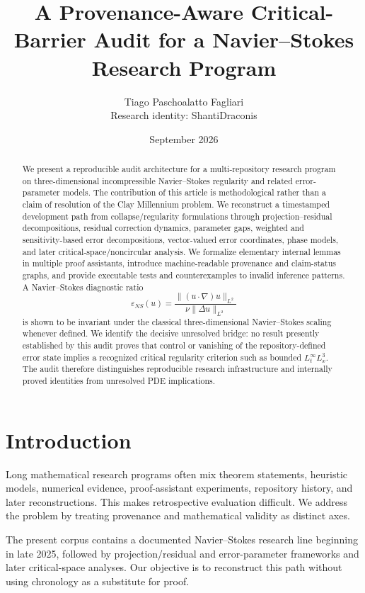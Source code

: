 \documentclass[11pt]{article}
\title{A Provenance-Aware Critical-Barrier Audit for a Navier--Stokes Research Program}
\author{Tiago Paschoalatto Fagliari\\Research identity: ShantiDraconis}
\date{September 2026}
\begin{document}
\maketitle
\begin{abstract}
We present a reproducible audit architecture for a multi-repository research program on three-dimensional incompressible Navier--Stokes regularity and related error-parameter models. The contribution of this article is methodological rather than a claim of resolution of the Clay Millennium problem. We reconstruct a timestamped development path from collapse/regularity formulations through projection--residual decompositions, residual correction dynamics, parameter gaps, weighted and sensitivity-based error decompositions, vector-valued error coordinates, phase models, and later critical-space/noncircular analysis. We formalize elementary internal lemmas in multiple proof assistants, introduce machine-readable provenance and claim-status graphs, and provide executable tests and counterexamples to invalid inference patterns. A Navier--Stokes diagnostic ratio
\[
\varepsilon_{NS}(u)=\frac{\|(u\cdot\nabla)u\|_{L^2}}{\nu\|\Delta u\|_{L^2}}
\]
is shown to be invariant under the classical three-dimensional Navier--Stokes scaling whenever defined. We identify the decisive unresolved bridge: no result presently established by this audit proves that control or vanishing of the repository-defined error state implies a recognized critical regularity criterion such as bounded $L^\infty_tL^3_x$. The audit therefore distinguishes reproducible research infrastructure and internally proved identities from unresolved PDE implications.
\end{abstract}

\section{Introduction}
Long mathematical research programs often mix theorem statements, heuristic models, numerical evidence, proof-assistant experiments, repository history, and later reconstructions. This makes retrospective evaluation difficult. We address the problem by treating provenance and mathematical validity as distinct axes.

The present corpus contains a documented Navier--Stokes research line beginning in late 2025, followed by projection/residual and error-parameter frameworks and later critical-space analyses. Our objective is to reconstruct this path without using chronology as a substitute for proof.
\end{document}
